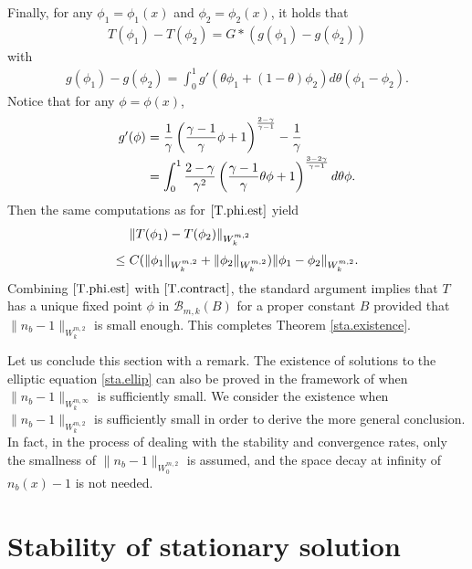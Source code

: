 \documentclass[11pt]{amsart}
\numberwithin{equation}{section}
\begin{document}
Finally, for any $\phi_{1}=\phi_{1}(x)$ and $\phi_{2}=\phi_{2}(x)$,
it holds that
\begin{eqnarray*}
T(\phi_{1})-T(\phi_{2})=G*(g(\phi_{1})-g(\phi_{2}))
\end{eqnarray*}
with
\begin{eqnarray*}
g(\phi_{1})-g(\phi_{2})=\int_{0}^{1}g'(\theta\phi_{1}+(1-\theta)\phi_{2})d\theta(\phi_{1}-\phi_{2}).
\end{eqnarray*}
Notice that for any $\phi=\phi(x)$,
\begin{eqnarray*}
\arraycolsep=1.5pt
\begin{array}{rcl}
g'(\phi)&=&\displaystyle\frac{1}{\gamma}\left(\frac{\gamma-1}{\gamma}\phi+1\right)^{\frac{2-\gamma}{\gamma-1}}
-\frac{1}{\gamma}\\[3mm]
&=&\displaystyle\int_{0}^{1}\frac{2-\gamma}{\gamma^{2}}
\left(\frac{\gamma-1}{\gamma}\theta\phi+1\right)^{\frac{3-2\gamma}{\gamma-1}}d\theta\phi.
\end{array}
\end{eqnarray*}
Then the same computations as for $\eqref{T.phi.est}$ yield
\begin{eqnarray}\label{T.contract}
\arraycolsep=1.5pt
\begin{array}{rl}
&\|T(\phi_{1})-T(\phi_{2})\|_{W_{k}^{m,2}}\\[3mm]
\leq & C
(\|\phi_{1}\|_{W^{m,2}_{k}}+\|\phi_{2}\|_{W^{m,2}_{k}})\|\phi_{1}-\phi_{2}\|_{W^{m,2}_{k}}.
\end{array}
\end{eqnarray}
Combining $\eqref{T.phi.est}$ with $ \eqref{T.contract}$, the
standard argument implies that $T$ has a unique fixed point $\phi$
in $ \mathscr{B}_{m,k}(B)$ for a proper constant $B$ provided that
$\|n_{b}-1\|_{W^{m,2}_{k}}$ is small enough. This completes Theorem
\ref{sta.existence}.

Let us conclude this section with a remark. The existence of
solutions to the elliptic equation \eqref{sta.ellip} can also be
proved in the framework of \cite{RY} when
$\|n_{b}-1\|_{W^{m,\infty}_{k}}$ is sufficiently small. We consider
the existence  when $\|n_{b}-1\|_{W^{m,2}_{k}}$ is sufficiently
small in order to derive the more general conclusion. In fact, in
the process of dealing with the stability and convergence rates,
only the smallness of $\|n_{b}-1\|_{W^{m,2}_{0}}$ is assumed, and
the space decay at infinity of $n_{b}(x)-1$ is not needed.
\vspace{6mm}

\section{Stability of stationary solution}
\end{document}
